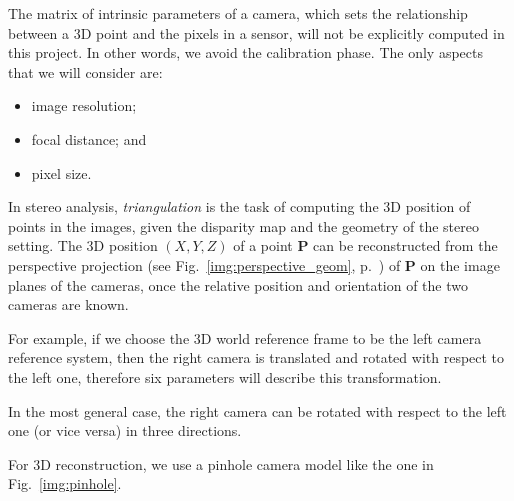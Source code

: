 The matrix of intrinsic parameters of a camera, which sets the relationship between a 3D point and the pixels in a sensor, will not be explicitly computed in this project. In other words, we avoid the calibration phase. The only aspects that we will consider are:
\begin{itemize}
\item image resolution;

\item focal distance; and

\item pixel size.
\end{itemize}





In stereo analysis, \emph{triangulation} is the task of computing the 3D position of points in the images, given the disparity map and the geometry of the stereo setting. The 3D position $(X, Y, Z)$ of a point $\mathbf{P}$ can be reconstructed from the perspective projection (see Fig.~\ref{img:perspective_geom}, p.~\pageref{img:perspective_geom}) of $\mathbf{P}$ on the image planes of the cameras, once the relative position and orientation of the two cameras are known.

For example, if we choose the 3D world reference frame to be the left camera reference system, then the right camera is translated and rotated with respect to the left one, therefore six parameters will describe this transformation.

In the most general case, the right camera can be rotated with respect to the left one (or vice versa) in three directions.


\bigskip


For 3D reconstruction, we use a pinhole camera model like the one in Fig.~\ref{img:pinhole}.


